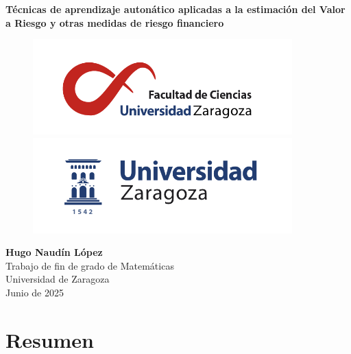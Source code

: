 \documentclass[11pt]{book}
\newcommand{\clearemptydoublepage}{\newpage{\pagestyle{empty}\cleardoublepage}}
\theoremstyle{plain} %
\theoremstyle{definition} %
\begin{document}
\frontmatter                     %
\pagestyle{primeraparte}    %


\begin{titlepage}
\begin{center}

\null
\vfill

\Huge{\bfseries Técnicas de aprendizaje autonático aplicadas a la estimación del Valor a Riesgo y otras medidas de riesgo financiero}

\vfill

\noindent
\begin{figure}[h]
\centering
\includegraphics[width=100mm]{ciencias.png}\\%
\includegraphics[width=100mm]{logoUZ.png}
\end{figure}

\vfill

\Huge{\bfseries Hugo Naudín López}\\%
\Huge{Trabajo de fin de grado de Matemáticas}\\%
\Huge{Universidad de Zaragoza}\\%

\vfill
\huge{Junio de 2025}
\end{center}
\end{titlepage}

\clearemptydoublepage


\chapter{Resumen}
\end{document}
